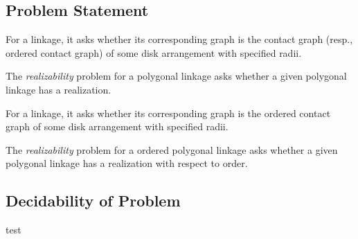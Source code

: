 \subsection{Problem Statement} 
\begin{prob}
For a linkage, it asks 
whether its corresponding graph is the contact graph (resp., ordered contact graph) of some disk 
arrangement with specified radii.
\end{prob}
\begin{prob}
The \emph{realizability} problem for a polygonal linkage asks whether a given polygonal linkage has 
a realization.
\end{prob}
\begin{prob}
For a linkage, it asks 
whether its corresponding graph is the ordered contact graph of some 
disk arrangement with specified radii.
\end{prob}
\begin{prob}
The \emph{realizability} problem for a ordered polygonal linkage asks whether a given polygonal 
linkage has a realization with respect to order.
\end{prob}
\subsection{Decidability of Problem} test
